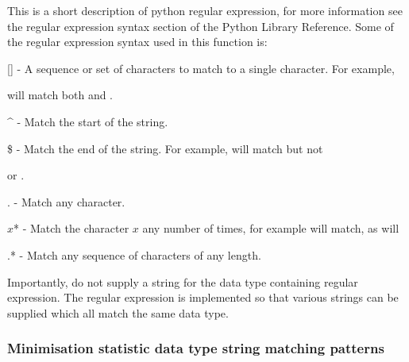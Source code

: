 This is a short description of python regular expression, for more information see the
regular expression syntax section of the Python Library Reference.  Some of the regular
expression syntax used in this function is:

    [] - A sequence or set of characters to match to a single character.  For example,
    
 will match both 
 and 
.

    \^{} - Match the start of the string.

    \$ - Match the end of the string.  For example, 
 will match 
 but not 

    or 
.

    . - Match any character.

    $x$* - Match the character $x$ any number of times, for example 
 will match, as will
    


    .* - Match any sequence of characters of any length.

Importantly, do not supply a string for the data type containing regular expression.  The
regular expression is implemented so that various strings can be supplied which all match
the same data type.


\subsubsection{Minimisation statistic data type string matching patterns}



